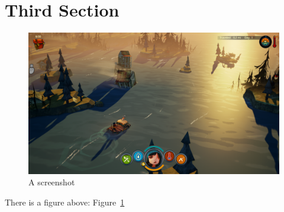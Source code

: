 \section{Third Section}

\begin{figure}[h!]
  \centering
  \includegraphics[width=0.4\linewidth]{flame_flood.png}
  \caption{A screenshot}\label{fig:1}
\end{figure}
There is a figure above: Figure~\ref{fig:1}